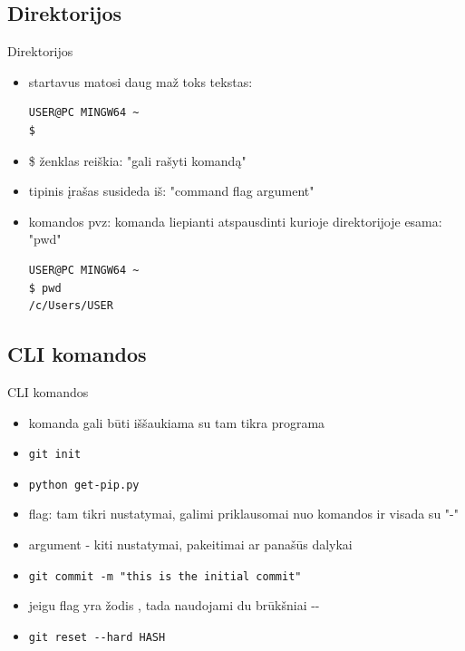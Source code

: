 \documentclass[11pt,xcolor=table]{beamer}
\begin{document}
\subsection{Direktorijos}

\begin{frame}[fragile]{Direktorijos}
\begin{itemize}
\item startavus matosi daug maž toks tekstas:

\begin{lstlisting}
USER@PC MINGW64 ~
$ 
\end{lstlisting}

\item \$ ženklas reiškia: "gali rašyti komandą"
\item tipinis įrašas susideda iš: "command flag argument"
\item komandos pvz: komanda liepianti atspausdinti kurioje direktorijoje esama: "pwd"

\begin{lstlisting}
USER@PC MINGW64 ~
$ pwd
/c/Users/USER
\end{lstlisting}

\end{itemize}
\end{frame}


\subsection{CLI komandos}
\begin{frame}[fragile]{CLI komandos}
\begin{itemize}
\item komanda gali būti iššaukiama su tam tikra programa
\item \colorbox{listinggray}{\lstinline|git init|}
\item \colorbox{listinggray}{\lstinline|python get-pip.py|}
\item flag: tam tikri nustatymai, galimi priklausomai nuo komandos ir visada su "-"
\item argument - kiti nustatymai, pakeitimai ar panašūs dalykai
\item \colorbox{listinggray}{\lstinline|git commit -m "this is the initial commit"|}
\item jeigu flag yra žodis , tada naudojami du brūkšniai -\/- 
\item \colorbox{listinggray}{\lstinline|git reset --hard HASH|}

\end{itemize}
\end{frame}
\end{document}
